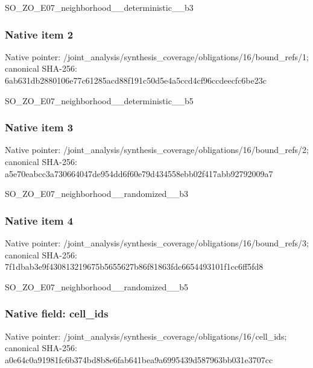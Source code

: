 \documentclass[10pt,a4paper]{article}
\begin{document}
\begingroup\raggedright\sloppy SO\_\allowbreak{}ZO\_\allowbreak{}E07\_\allowbreak{}neighborhood\_\allowbreak{}\_\allowbreak{}deterministic\_\allowbreak{}\_\allowbreak{}b3\par\endgroup

\subsubsection{Native item 2}
Native pointer: /joint\_\allowbreak{}analysis/synthesis\_\allowbreak{}coverage/obligations/16/bound\_\allowbreak{}refs/1; canonical SHA-256: 6ab631db2880106e77c61285acd88f191c50d5e4a5ccd4cf96ccdeecfc6be23c

\begingroup\raggedright\sloppy SO\_\allowbreak{}ZO\_\allowbreak{}E07\_\allowbreak{}neighborhood\_\allowbreak{}\_\allowbreak{}deterministic\_\allowbreak{}\_\allowbreak{}b5\par\endgroup

\subsubsection{Native item 3}
Native pointer: /joint\_\allowbreak{}analysis/synthesis\_\allowbreak{}coverage/obligations/16/bound\_\allowbreak{}refs/2; canonical SHA-256: a5e70eabcc3a730664047de954dd6f60e79d434558ebb02f417abb92792009a7

\begingroup\raggedright\sloppy SO\_\allowbreak{}ZO\_\allowbreak{}E07\_\allowbreak{}neighborhood\_\allowbreak{}\_\allowbreak{}randomized\_\allowbreak{}\_\allowbreak{}b3\par\endgroup

\subsubsection{Native item 4}
Native pointer: /joint\_\allowbreak{}analysis/synthesis\_\allowbreak{}coverage/obligations/16/bound\_\allowbreak{}refs/3; canonical SHA-256: 7f1dbab3e9f430813219675b5655627b86f81863fdc6654493101f1cc6ff5fd8

\begingroup\raggedright\sloppy SO\_\allowbreak{}ZO\_\allowbreak{}E07\_\allowbreak{}neighborhood\_\allowbreak{}\_\allowbreak{}randomized\_\allowbreak{}\_\allowbreak{}b5\par\endgroup

\subsubsection{Native field: cell\_\allowbreak{}ids}
Native pointer: /joint\_\allowbreak{}analysis/synthesis\_\allowbreak{}coverage/obligations/16/cell\_\allowbreak{}ids; canonical SHA-256: a0e64c0a91981fc6b374bd8b8e6fab641bea9a6995439d587963bb031e3707cc
\end{document}
